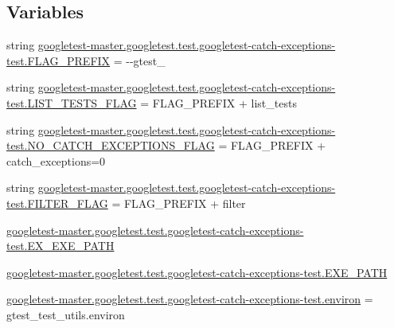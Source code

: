 \subsection*{Variables}
\begin{DoxyCompactItemize}
\item 
string \mbox{\hyperlink{namespacegoogletest-master_1_1googletest_1_1test_1_1googletest-catch-exceptions-test_a5a6d0124f5f04b440948d2b7f8fe38ed}{googletest-\/master.\+googletest.\+test.\+googletest-\/catch-\/exceptions-\/test.\+F\+L\+A\+G\+\_\+\+P\+R\+E\+F\+IX}} = \textquotesingle{}-\/-\/gtest\+\_\+\textquotesingle{}
\item 
string \mbox{\hyperlink{namespacegoogletest-master_1_1googletest_1_1test_1_1googletest-catch-exceptions-test_a723e7330541923823ea13af2f2c31e9b}{googletest-\/master.\+googletest.\+test.\+googletest-\/catch-\/exceptions-\/test.\+L\+I\+S\+T\+\_\+\+T\+E\+S\+T\+S\+\_\+\+F\+L\+AG}} = F\+L\+A\+G\+\_\+\+P\+R\+E\+F\+IX + \textquotesingle{}list\+\_\+tests\textquotesingle{}
\item 
string \mbox{\hyperlink{namespacegoogletest-master_1_1googletest_1_1test_1_1googletest-catch-exceptions-test_a1d7303a74a12ca7dc2dc35c39d9b19a2}{googletest-\/master.\+googletest.\+test.\+googletest-\/catch-\/exceptions-\/test.\+N\+O\+\_\+\+C\+A\+T\+C\+H\+\_\+\+E\+X\+C\+E\+P\+T\+I\+O\+N\+S\+\_\+\+F\+L\+AG}} = F\+L\+A\+G\+\_\+\+P\+R\+E\+F\+IX + \textquotesingle{}catch\+\_\+exceptions=0\textquotesingle{}
\item 
string \mbox{\hyperlink{namespacegoogletest-master_1_1googletest_1_1test_1_1googletest-catch-exceptions-test_a953668158e0c32848380f097e1c1d3f2}{googletest-\/master.\+googletest.\+test.\+googletest-\/catch-\/exceptions-\/test.\+F\+I\+L\+T\+E\+R\+\_\+\+F\+L\+AG}} = F\+L\+A\+G\+\_\+\+P\+R\+E\+F\+IX + \textquotesingle{}filter\textquotesingle{}
\item 
\mbox{\hyperlink{namespacegoogletest-master_1_1googletest_1_1test_1_1googletest-catch-exceptions-test_a721cc5d874c84f79d6df66e4bbc5c500}{googletest-\/master.\+googletest.\+test.\+googletest-\/catch-\/exceptions-\/test.\+E\+X\+\_\+\+E\+X\+E\+\_\+\+P\+A\+TH}}
\item 
\mbox{\hyperlink{namespacegoogletest-master_1_1googletest_1_1test_1_1googletest-catch-exceptions-test_a300e82ace998132cf7010379cd91095a}{googletest-\/master.\+googletest.\+test.\+googletest-\/catch-\/exceptions-\/test.\+E\+X\+E\+\_\+\+P\+A\+TH}}
\item 
\mbox{\hyperlink{namespacegoogletest-master_1_1googletest_1_1test_1_1googletest-catch-exceptions-test_a3b2bff4e4eb736ed36b2075183fe8d8a}{googletest-\/master.\+googletest.\+test.\+googletest-\/catch-\/exceptions-\/test.\+environ}} = gtest\+\_\+test\+\_\+utils.\+environ

\end{DoxyCompactItemize}
